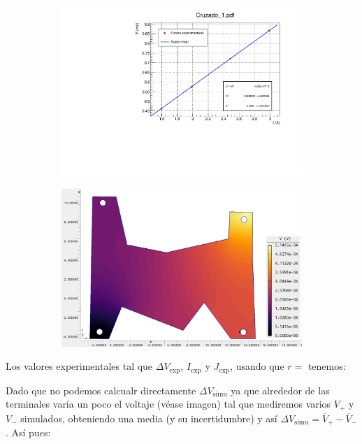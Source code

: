\documentclass[11pt]{article}
\newcommand{\simu}{\text{simu}}
\begin{document}
\begin{figure}[h!]\centering
\begin{subfigure}[b]{0.49\textwidth}
	\includegraphics[width=1.05\linewidth]{Programas/Cruzado_1.pdf}
\end{subfigure} \hfill
\begin{subfigure}[b]{0.49\textwidth}
	\includegraphics[width=1.05\linewidth]{Imagen Agros 1/Agros1.png}
\end{subfigure}
\end{figure}

Los valores experimentales tal que $\Delta V_{\exp}$, $I_{\exp}$ y $J_{\exp}$, usando que $r=$ tenemos: 



Dado que no podemos calcualr directamente $\Delta V_{\simu}$ ya que alrededor de las terminales varía un poco el voltaje (véase imagen) tal que mediremos varios $V_+$ y $V_-$ simulados, obteniendo una media (y su incertidumbre) y así $\Delta V_{\simu} = \overline{V}_+ - \overline{V}_{-} $. Así pues: 
\end{document}
